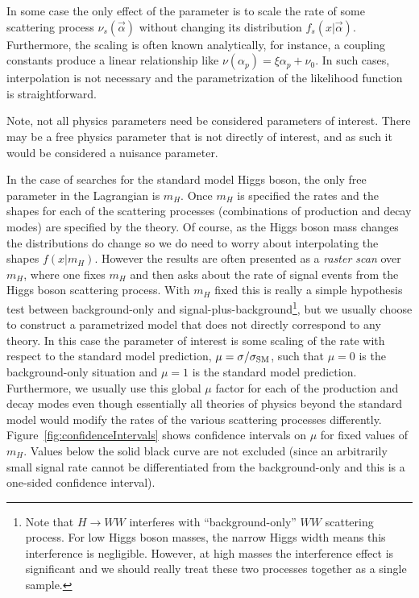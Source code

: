In some case the only effect of the parameter is to scale the rate of some scattering process $\nu_s(\vec\alpha)$ without changing its distribution $f_s(x|\vec\alpha)$.  Furthermore, the scaling is often known analytically, for instance, a coupling constants produce a linear relationship like $\nu(\alpha_p) = \xi \alpha_p  + \nu_0$.  In such cases, interpolation is not necessary and the parametrization of the likelihood function is straightforward.  


Note, not all physics parameters need be considered parameters of interest.  There may be a free physics parameter that is not directly of interest, and as such it would be considered a nuisance parameter.  


In the case of searches for the standard model Higgs boson, the only free parameter in the Lagrangian is $m_H$.  Once $m_H$ is specified the rates and the shapes for each of the scattering processes (combinations of production and decay modes) are specified by the theory.  Of course, as the Higgs boson mass changes the distributions do change so we do need to worry about interpolating the shapes $f(x|m_H)$.  However the results are often presented as a \textit{raster scan} over $m_H$, where one fixes $m_H$ and then asks about the rate of signal events from the Higgs boson scattering process.  With $m_H$ fixed this is really a simple hypothesis test between background-only and signal-plus-background\footnote{Note that  $H\to WW$ interferes with ``background-only'' $WW$ scattering process.  For low Higgs boson masses, the narrow Higgs width means this interference is negligible.  However, at high masses the interference effect is significant and we should really treat these two processes together as a single sample.}, but we usually choose to construct a parametrized model that does not directly correspond to any theory.  In this case the parameter of interest is some scaling of the rate with respect to the standard model prediction, $\mu = \sigma / \sigma_{\rm SM}$, such that $\mu=0$ is the background-only situation and $\mu=1$ is the standard model prediction.  Furthermore, we usually use this global $\mu$ factor for each of the production and decay modes even though essentially all theories of physics beyond the standard model would modify the rates of the various scattering processes differently. Figure~\ref{fig:confidenceIntervals} shows confidence intervals on $\mu$ for fixed values of $m_H$.  Values below the solid black curve are not excluded (since an arbitrarily small signal rate cannot be differentiated from the background-only and this is a one-sided confidence interval).


